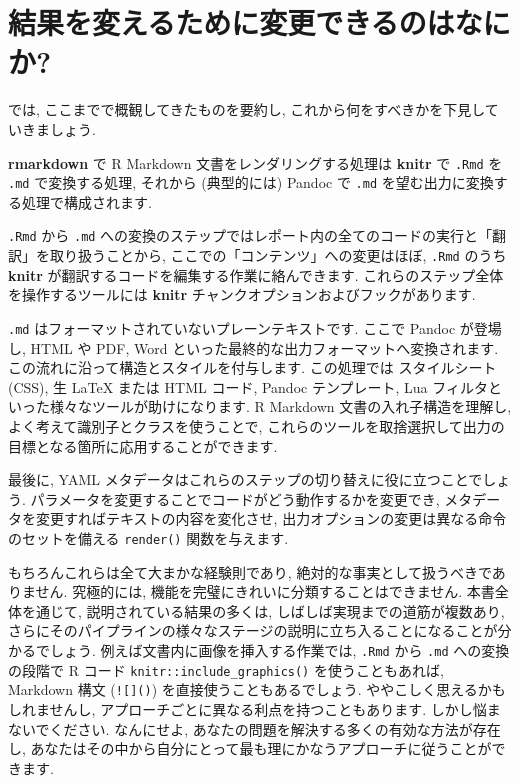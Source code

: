 \documentclass[
  11pt,
  lualatex,
  ja=standard]{bxjsreport}
\begin{document}
\hypertarget{what-to-change}{%
\section{結果を変えるために変更できるのはなにか?}\label{what-to-change}}

では, ここまでで概観してきたものを要約し, これから何をすべきかを下見していきましょう.

\textbf{rmarkdown} で R Markdown 文書をレンダリングする処理は \textbf{knitr} で \texttt{.Rmd} を \texttt{.md} で変換する処理, それから (典型的には) Pandoc で \texttt{.md} を望む出力に変換する処理で構成されます.

\texttt{.Rmd} から \texttt{.md} への変換のステップではレポート内の全てのコードの実行と「翻訳」を取り扱うことから, ここでの「コンテンツ」への変更はほぼ, \texttt{.Rmd} のうち \textbf{knitr} が翻訳するコードを編集する作業に絡んできます. これらのステップ全体を操作するツールには \textbf{knitr} チャンクオプションおよびフックがあります.

\texttt{.md} はフォーマットされていないプレーンテキストです. ここで Pandoc が登場し, HTML や PDF, Word といった最終的な出力フォーマットへ変換されます. この流れに沿って構造とスタイルを付与します. この処理では スタイルシート (CSS), 生 LaTeX または HTML コード, Pandoc テンプレート, Lua フィルタといった様々なツールが助けになります. R Markdown 文書の入れ子構造を理解し, よく考えて識別子とクラスを使うことで, これらのツールを取捨選択して出力の目標となる箇所に応用することができます.

最後に, YAML メタデータはこれらのステップの切り替えに役に立つことでしょう. パラメータを変更することでコードがどう動作するかを変更でき, メタデータを変更すればテキストの内容を変化させ, 出力オプションの変更は異なる命令のセットを備える \texttt{render()} 関数を与えます.

もちろんこれらは全て大まかな経験則であり, 絶対的な事実として扱うべきでありません. 究極的には, 機能を完璧にきれいに分類することはできません. 本書全体を通じて, 説明されている結果の多くは, しばしば実現までの道筋が複数あり, さらにそのパイプラインの様々なステージの説明に立ち入ることになることが分かるでしょう. 例えば文書内に画像を挿入する作業では, \texttt{.Rmd} から \texttt{.md} への変換の段階で R コード \texttt{knitr::include\_graphics()} を使うこともあれば, Markdown 構文 (\texttt{!{[}{]}()}) を直接使うこともあるでしょう. ややこしく思えるかもしれませんし, アプローチごとに異なる利点を持つこともあります. しかし悩まないでください. なんにせよ, あなたの問題を解決する多くの有効な方法が存在し, あなたはその中から自分にとって最も理にかなうアプローチに従うことができます.
\end{document}
